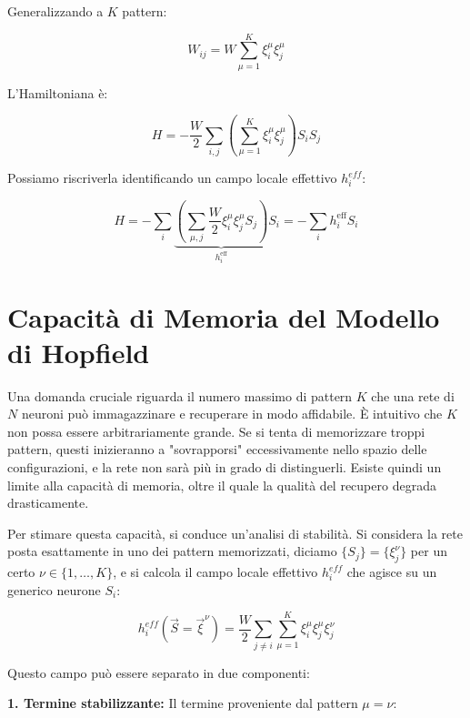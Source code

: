 Generalizzando a $K$ pattern:

\begin{equation} \label{eq:ch21_23}
W_{ij} = W\sum_{\mu=1}^K \xi_i^\mu \xi_j^\mu
\end{equation}

L'Hamiltoniana è:

\begin{equation} \label{eq:ch21_24}
H = -\frac{W}{2} \sum_{i,j} \left( \sum_{\mu=1}^K \xi_i^\mu \xi_j^\mu \right) S_i S_j
\end{equation}

Possiamo riscriverla identificando un campo locale effettivo $h_i^{eff}$:

\begin{equation} \label{eq:ch21_25}
H = -\sum_{i} \underbrace{\left( \sum_{\mu, j}\frac{W}{2}  \xi_i^\mu \xi_j^\mu S_j\right)}_{h^{\text{eff}}_{i}} S_i = -\sum_{i} h^{\text{eff}}_{i} S_i
\end{equation}


\section{Capacità di Memoria del Modello di Hopfield}
Una domanda cruciale riguarda il numero massimo di pattern $K$ che una rete di $N$ neuroni può immagazzinare e recuperare in modo affidabile. È intuitivo che $K$ non possa essere arbitrariamente grande. Se si tenta di memorizzare troppi pattern, questi inizieranno a "sovrapporsi" eccessivamente nello spazio delle configurazioni, e la rete non sarà più in grado di distinguerli. Esiste quindi un limite alla capacità di memoria, oltre il quale la qualità del recupero degrada drasticamente.

Per stimare questa capacità, si conduce un'analisi di stabilità.
Si considera la rete posta esattamente in uno dei pattern memorizzati, diciamo $\{S_j\} = \{\xi_j^\nu\}$ per un certo $\nu \in \{1, \dots, K\}$, e si calcola il campo locale effettivo $h_i^{eff}$ che agisce su un generico neurone $S_i$:

\begin{equation} \label{eq:ch21_26}
h_i^{eff}(\vec{S}=\vec{\xi}^\nu) = \frac{W}{2} \sum_{j \neq i} \sum_{\mu=1}^K \xi_i^\mu \xi_j^\mu \xi_j^\nu
\end{equation}

Questo campo può essere separato in due componenti:

\textbf{1. Termine stabilizzante:}
Il termine proveniente dal pattern $\mu = \nu$:

